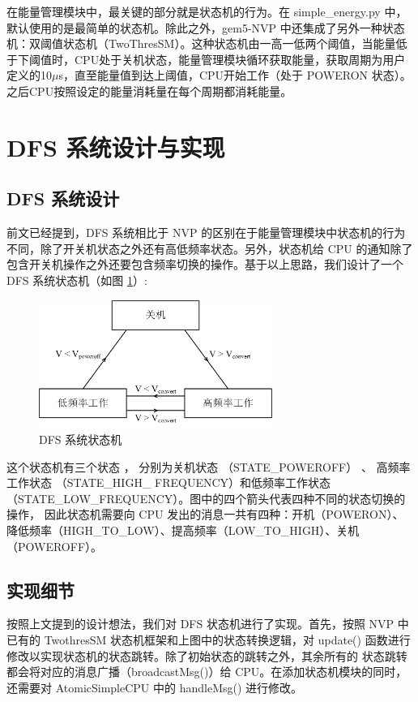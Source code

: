 \documentclass[a4paper,titlepage]{report}
\begin{document}
在能量管理模块中，最关键的部分就是状态机的行为。在 simple\_energy.py 中，默认使用的是最简单的状态机。除此之外，gem5-NVP 中还集成了另外一种状态机：双阈值状态机（TwoThresSM）。这种状态机由一高一低两个阈值，当能量低于下阈值时，CPU处于关机状态，能量管理模块循环获取能量，获取周期为用户定义的10$\mu$s，直至能量值到达上阈值，CPU开始工作（处于 POWERON 状态）。之后CPU按照设定的能量消耗量在每个周期都消耗能量。

\section{DFS 系统设计与实现} \label{sec:dfs}

\subsection{DFS 系统设计}

前文已经提到，DFS 系统相比于 NVP 的区别在于能量管理模块中状态机的行为不同，除了开关机状态之外还有高低频率状态。另外，状态机给 CPU 的通知除了包含开关机操作之外还要包含频率切换的操作。基于以上思路，我们设计了一个 DFS 系统状态机（如图 \ref{state_machine}）:

\begin{figure}[!htp]
\centering
\includegraphics[width = 3in]{state_machine.jpg}
\caption{DFS 系统状态机}
\label{state_machine}
\end{figure}

这个状态机有三个状态 ， 分别为关机状态 （STATE\_POWEROFF） 、 高频率工作状态 （STATE\_HIGH\_ FREQUENCY）和低频率工作状态 （STATE\_LOW\_FREQUENCY）。图中的四个箭头代表四种不同的状态切换的操作， 因此状态机需要向 CPU 发出的消息一共有四种：开机（POWERON）、降低频率（HIGH\_TO\_LOW）、提高频率（LOW\_TO\_HIGH）、关机（POWEROFF）。

\subsection{实现细节}

按照上文提到的设计想法，我们对 DFS 状态机进行了实现。首先，按照 NVP 中已有的 TwothresSM 状态机框架和上图中的状态转换逻辑，对 update() 函数进行修改以实现状态机的状态跳转。除了初始状态的跳转之外，其余所有的 状态跳转都会将对应的消息广播（broadcastMsg()）给 CPU。在添加状态机模块的同时，还需要对 AtomicSimpleCPU 中的 handleMsg() 进行修改。
\end{document}
